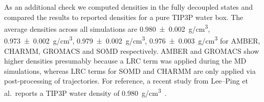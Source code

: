 \documentclass[journal=jctcce,manuscript=article]{achemso}
\begin{document}
As an additional check we computed densities in the fully decoupled
states and compared the results to reported densities for a pure TIP3P
water box.  The average densities across all simulations are
\SI{0.980+-0.002}{g/cm^3}, \SI{0.973+-0.002}{g/cm^3},
\SI{0.979+-0.002}{g/cm^3}, \SI{0.976+-0.003}{g/cm^3} for AMBER,
CHARMM, GROMACS and SOMD respectively.  AMBER and GROMACS show higher
densities presumably because a LRC term was applied during the MD
simulations, whereas LRC terms for SOMD and CHARMM are only applied via
post-processing of trajectories.  For reference, a recent study from Lee--Ping et al.\ reports a
TIP3P water density of \SI{0.980}{g/cm^3}~\cite{doi:10.1021/jz500737m}.

\begin{table}[]
  \begin{minipage}{\linewidth}
    \caption{Absolute hydration free energies (in kcal/mol) and end-state densities  (in g/cm3) as obtained from AFE calculations. Uncertainties on the last decimal are given in parenthesis.}\label{tab:absolute2}
\end{minipage}
\end{table}
\end{document}
